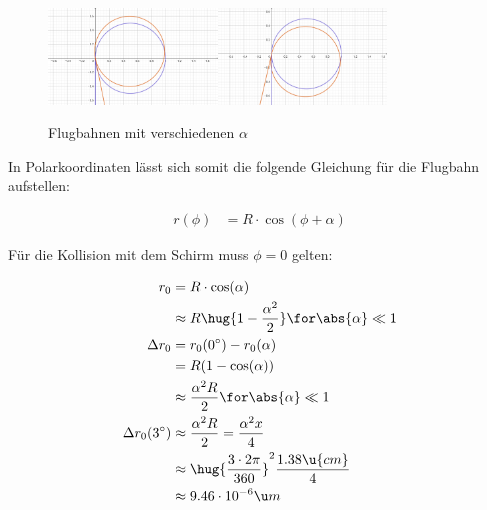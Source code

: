 \documentclass[11pt]{article}
\begin{document}
\begin{figure}[h]
    \centering
    \hspace{\fill}\includegraphics[width=0.4\textwidth]{1}\includegraphics[width=0.4\textwidth]{2}\hspace*{\fill}
    \caption{Flugbahnen mit verschiedenen $\alpha$}
\end{figure}

\begin{adjustwidth}{20pt}{}
    In Polarkoordinaten lässt sich somit die folgende Gleichung für die Flugbahn aufstellen: 
\end{adjustwidth}
\begin{align*}
    r(\phi) &= R\cdot \cos(\phi + \alpha)
\end{align*}
\begin{adjustwidth}{20pt}{}
    Für die Kollision mit dem Schirm muss $\phi=0$ gelten:
\end{adjustwidth}
\begin{align*}
    r_0 &= R\cdot \cos(\alpha)\\
    &\approx R \hug{1-\frac{\alpha^2}{2}} \for \abs{\alpha} \ll 1\\
    \Delta r_0 &= r_0(0^\circ) - r_0(\alpha)\\
    &= R(1-\cos(\alpha)) \\
    &\approx \frac{\alpha^2 R}{2 } \for \abs{\alpha} \ll 1\\
    \Delta r_0 (3^\circ)&\approx \frac{\alpha^2 R}{2 }  
    = \frac{\alpha^2 x}{4 }\\
    &\approx \hug{\frac{3\cdot 2\pi}{360}}^2 \frac{1.38\u{cm}}{4}\\
    &\approx 9.46\cdot 10^{-6}\u m
\end{align*}
\end{document}
